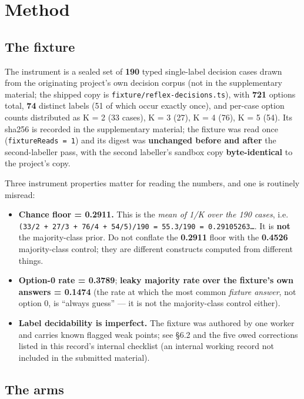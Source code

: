 \documentclass[10pt]{article}
\begin{document}
\section{Method}

\subsection{The fixture}

The instrument is a sealed set of \textbf{190} typed single-label decision cases drawn from the originating project's own decision corpus (not in the supplementary material; the shipped copy is \texttt{fixture/reflex-decisions.ts}), with \textbf{721} options total, \textbf{74} distinct labels (51 of which occur exactly once), and per-case option counts distributed as K = 2 (33 cases), K = 3 (27), K = 4 (76), K = 5 (54). Its sha256 is recorded in the supplementary material; the fixture was read once (\texttt{fixtureReads = 1}) and its digest was \textbf{unchanged before and after} the second-labeller pass, with the second labeller's sandbox copy \textbf{byte-identical} to the project's copy.

Three instrument properties matter for reading the numbers, and one is routinely misread:

\begin{itemize}
\item \textbf{Chance floor = 0.2911.} This is the \emph{mean of 1/K over the 190 cases}, i.e. \texttt{(33/2 + 27/3 + 76/4 + 54/5)/190 = 55.3/190 = 0.29105263\ldots{}}. It is \textbf{not} the majority-class prior. Do not conflate the \textbf{0.2911} floor with the \textbf{0.4526} majority-class control; they are different constructs computed from different things.
\item \textbf{Option-0 rate = 0.3789}; \textbf{leaky majority rate over the fixture's own answers = 0.1474} (the rate at which the most common \emph{fixture answer}, not option 0, is ``always guess'' --- it is not the majority-class control either).
\item \textbf{Label decidability is imperfect.} The fixture was authored by one worker and carries known flagged weak points; see \S6.2 and the five owed corrections listed in this record's internal checklist (an internal working record not included in the submitted material).
\end{itemize}

\subsection{The arms}
\end{document}
